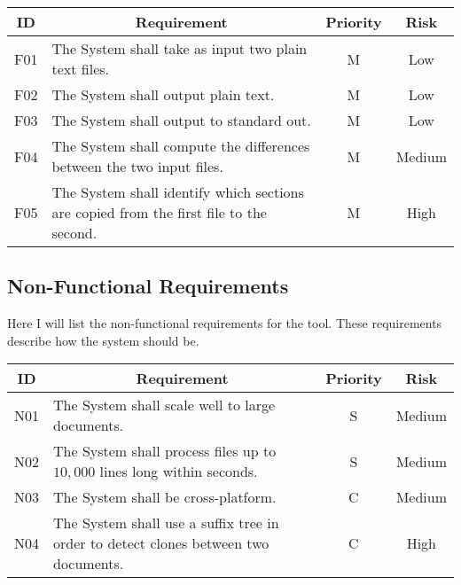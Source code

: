 \begin{center}
\begin{longtable}{c p{2.8in} c c }

	\toprule
	\textbf{ID} & \multicolumn{1}{c}{\textbf{Requirement}} & \textbf{Priority} & \textbf{Risk} \\
	\midrule
	
	F01 & The System shall take as input two plain text files. & M & Low \\
	F02 & The System shall output plain text. & M & Low \\
	F03 & The System shall output to standard out. & M & Low \\
	F04 & The System shall compute the differences between the two input files. & M & Medium \\
	F05 & The System shall identify which sections are copied from the first file to the second. & M & High \\

\bottomrule        
\end{longtable}
\end{center}

\subsection{Non-Functional Requirements}

Here I will list the non-functional requirements for the tool.
These requirements describe how the system should be.

\begin{center}
\begin{longtable}{c p{2.8in} c c }

	\toprule
	\textbf{ID} & \multicolumn{1}{c}{\textbf{Requirement}} & \textbf{Priority} & \textbf{Risk} \\
	\midrule
	
	N01 & The System shall scale well to large documents. & S & Medium \\
	N02 & The System shall process files up to $10,000$ lines long within seconds. & S & Medium \\
	N03 & The System shall be cross-platform. & C & Medium \\
	N04 & The System shall use a suffix tree in order to detect clones between two documents. & C & High \\
	
\bottomrule
\end{longtable}
\end{center}
